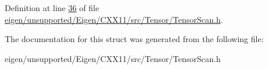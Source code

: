 Definition at line \hyperlink{eigen_2unsupported_2_eigen_2_c_x_x11_2src_2_tensor_2_tensor_scan_8h_source_l00036}{36} of file \hyperlink{eigen_2unsupported_2_eigen_2_c_x_x11_2src_2_tensor_2_tensor_scan_8h_source}{eigen/unsupported/\+Eigen/\+C\+X\+X11/src/\+Tensor/\+Tensor\+Scan.\+h}.



The documentation for this struct was generated from the following file\+:\begin{DoxyCompactItemize}
\item 
eigen/unsupported/\+Eigen/\+C\+X\+X11/src/\+Tensor/\+Tensor\+Scan.\+h\end{DoxyCompactItemize}

